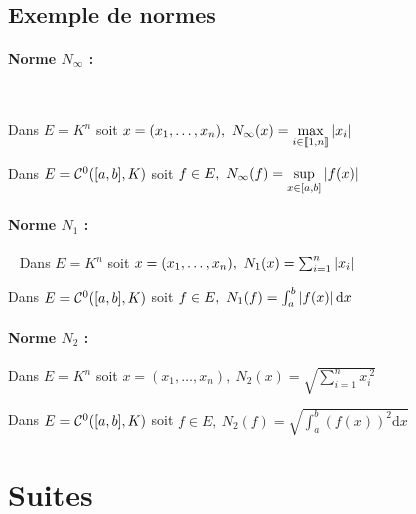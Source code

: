 		 ~\\
			
		 \medskip \\
		

		\medskip
			
	\subsection{Exemple de normes}

		\paragraph{Norme $N_{\infty}$ :}~
		
			Dans $E=K^n$ soit $x=(x_1,\dots ,x_n) ,~ N_{\infty}(x) = 
			\underset{i\in{\llbracket 1,n \rrbracket}}{\mathrm{max}} \left\vert x_i \right\vert$
		
			Dans $E={\mathcal{C}}^0([a,b],K)$ soit $f\in E,~N_{\infty} (f) = \underset{x\in [a,b]}{\mathrm{sup}} \left\vert f(x) \right\vert$
			
		\paragraph{Norme $N_1$ :} ~
			Dans $E=K^n$ soit $x=(x_1,\dots ,x_n) ,~ N_1(x) = \sum_{i=1}^n \left\vert x_i \right\vert $
			
			Dans $E={\mathcal{C}}^0([a,b],K)$ soit $f\in E,~N_1 (f) = \int_a^b \left\vert f(x) \right\vert \mathrm{d}x$
			
		\paragraph{Norme $N_2$ :} 
			Dans $E=K^n$ soit $x=(x_1,\dots ,x_n) ,~ N_2(x) = \sqrt{\sum_{i=1}^n x_i^{~2}} $
			
			Dans $E={\mathcal{C}}^0([a,b],K)$ soit $f\in E,~N_2 (f) = \sqrt{\int_a^b \left( f(x)\right)^2 \mathrm{d}x}$
		
		\medskip


\section{Suites}
		
